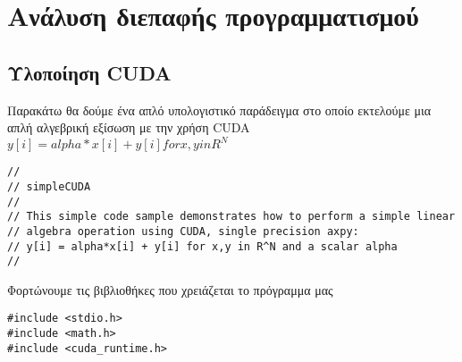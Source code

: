 \chapter{Ανάλυση διεπαφής προγραμματισμού}

\section{Υλοποίηση CUDA}
Παρακάτω θα δούμε ένα απλό υπολογιστικό παράδειγμα στο οποίο εκτελούμε μια απλή αλγεβρική εξίσωση με την χρήση CUDA $y[i] = alpha*x[i] + y[i] for x,y in R^N$ \cite{code-1}
\begin{lstlisting}[basicstyle=\scriptsize]
//
// simpleCUDA
//
// This simple code sample demonstrates how to perform a simple linear
// algebra operation using CUDA, single precision axpy:
// y[i] = alpha*x[i] + y[i] for x,y in R^N and a scalar alpha
//
\end{lstlisting}

Φορτώνουμε τις βιβλιοθήκες που χρειάζεται το πρόγραμμα μας
\begin{lstlisting}[basicstyle=\scriptsize]
#include <stdio.h>
#include <math.h>
#include <cuda_runtime.h>
\end{lstlisting}

